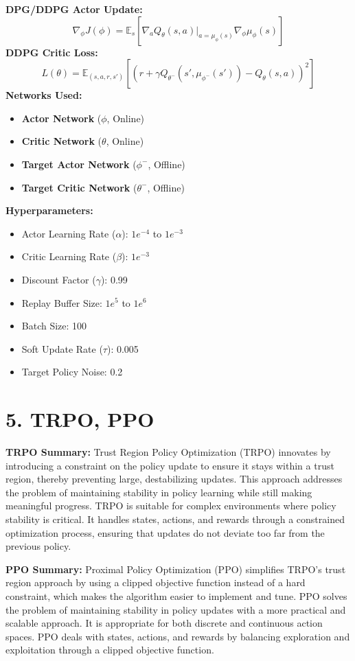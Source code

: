 \documentclass[a4paper,10pt]{article}
\begin{document}
\begin{multicols}{2}
\textbf{DPG/DDPG Actor Update:}
\[
\nabla_\phi J(\phi) = \mathbb{E}_s \left[ \nabla_a Q_\theta(s, a) \big|_{a=\mu_\phi(s)} \nabla_\phi \mu_\phi(s) \right]
\]
\textbf{DDPG Critic Loss:}
\[
L(\theta) = \mathbb{E}_{(s, a, r, s')} \left[ \left( r + \gamma Q_{\theta^-}(s', \mu_{\phi^-}(s')) - Q_\theta(s, a) \right)^2 \right]
\]
\textbf{Networks Used:}
\begin{itemize}
    \item \textbf{Actor Network} (\(\phi\), Online)
    \item \textbf{Critic Network} (\(\theta\), Online)
    \item \textbf{Target Actor Network} (\(\phi^-\), Offline)
    \item \textbf{Target Critic Network} (\(\theta^-\), Offline)
\end{itemize}
\textbf{Hyperparameters:}
\begin{itemize}
    \item Actor Learning Rate (\(\alpha\)): \(1e^{-4}\) to \(1e^{-3}\)
    \item Critic Learning Rate (\(\beta\)): \(1e^{-3}\)
    \item Discount Factor (\(\gamma\)): 0.99
    \item Replay Buffer Size: \(1e^5\) to \(1e^6\)
    \item Batch Size: 100
    \item Soft Update Rate (\(\tau\)): 0.005
    \item Target Policy Noise: 0.2
\end{itemize}

\section*{5. TRPO, PPO}
\textbf{TRPO Summary:} Trust Region Policy Optimization (TRPO) innovates by introducing a constraint on the policy update to ensure it stays within a trust region, thereby preventing large, destabilizing updates. This approach addresses the problem of maintaining stability in policy learning while still making meaningful progress. TRPO is suitable for complex environments where policy stability is critical. It handles states, actions, and rewards through a constrained optimization process, ensuring that updates do not deviate too far from the previous policy.

\textbf{PPO Summary:} Proximal Policy Optimization (PPO) simplifies TRPO’s trust region approach by using a clipped objective function instead of a hard constraint, which makes the algorithm easier to implement and tune. PPO solves the problem of maintaining stability in policy updates with a more practical and scalable approach. It is appropriate for both discrete and continuous action spaces. PPO deals with states, actions, and rewards by balancing exploration and exploitation through a clipped objective function.


\end{multicols}
\end{document}
